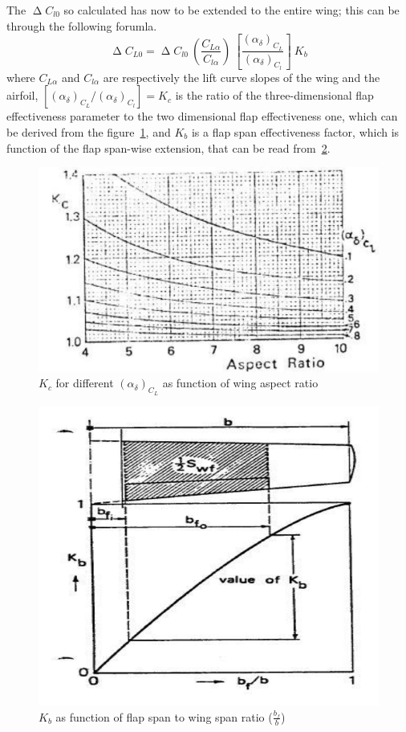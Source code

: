 %
\noindent
The $\upDelta C_{l0}$ so calculated has now to be extended to the entire wing; this can be through the following forumla.
%
\begin{equation}
\upDelta C_{L0}=\upDelta C_{l0}\ \left(\frac{C_{L\alpha}}{C_{l\alpha}}\right)\ \left[\frac{\left(\alpha_\delta\right)_{C_{L}}}{\left(\alpha_\delta\right)_{C_{l}}}\right]\ K_b
\label{eqn:c'/c}
\end{equation}
%
\noindent
where $C_{L\alpha}$ and $C_{l\alpha}$ are respectively the lift curve slopes of the wing and the airfoil, $\left[\left(\alpha_\delta\right)_{C_{L}}/\left(\alpha_\delta\right)_{C_{l}}\right]=K_c$ is the ratio of the three-dimensional flap effectiveness parameter to the two dimensional flap effectiveness one, which can be derived from the figure~\ref{fig:Kc}, and $K_b$ is a flap span effectiveness factor, which is function of the flap span-wise extension, that can be  read from~\ref{fig:Kb}.
%
\begin{figure}[!b]
  \centering
  \includegraphics[width=0.7\linewidth, angle=359]{Kc}
  \caption{$K_c$ for different $\left(\alpha_\delta\right)_{C_{L}}$ as function of wing aspect ratio}
  \label{fig:Kc}
\end{figure}
%
\begin{figure}[!t]
  \centering
  \includegraphics[width=0.5\linewidth, angle=359]{Kb}
  \caption{$K_b$ as function of flap span to wing span ratio ($\frac{b_f}{b}$)}
  \label{fig:Kb}
\end{figure}
%
